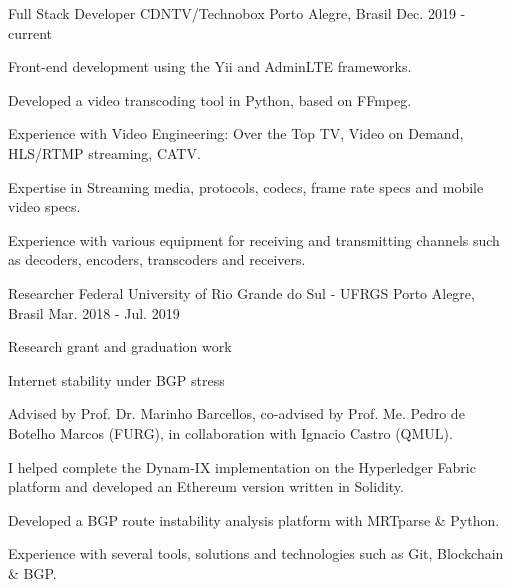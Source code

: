 

\begin{cventries}

  \cventry
    {Full Stack Developer} %
    {CDNTV/Technobox} %
    {Porto Alegre, Brasil} %
    {Dec. 2019 - current} %
    {
        \begin{cvitems} %
        \item {Front-end development using the Yii and AdminLTE frameworks.}
        \item {Developed a video transcoding tool in Python, based on FFmpeg.}
        \item {Experience with Video Engineering: Over the Top TV, Video on Demand, HLS/RTMP streaming, CATV.}
        \item {Expertise in Streaming media, protocols, codecs, frame rate specs and mobile video specs.}
        \item {Experience with various equipment for receiving and transmitting channels such as decoders, encoders, transcoders and receivers.}
      \end{cvitems}
    }

  \cventry
    {Researcher} %
    {Federal University of Rio Grande do Sul - UFRGS} %
    {Porto Alegre, Brasil} %
    {Mar. 2018 - Jul. 2019} %
    {
      \begin{cvitems} %
        \item {Research grant and graduation work}
        \item {Internet stability under BGP stress}
        \item {Advised by Prof. Dr. Marinho Barcellos, co-advised by Prof. Me. Pedro de Botelho Marcos (FURG), in collaboration with Ignacio Castro (QMUL).}
        \item {I helped complete the Dynam-IX implementation on the Hyperledger Fabric platform and developed an Ethereum version written in Solidity.}
        \item {Developed a BGP route instability analysis platform with MRTparse \& Python.}
        \item {Experience with several tools, solutions and technologies such as Git, Blockchain \& BGP.}
      \end{cvitems}
    }



\end{cventries}

